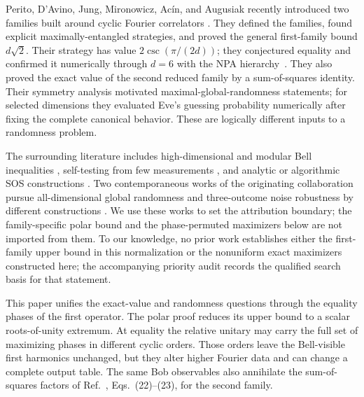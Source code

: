 \documentclass[11pt]{article}
\theoremstyle{definition}
\theoremstyle{remark}
\begin{document}
Perito, D'Avino, Jung, Mironowicz, Ac\'in, and Augusiak recently introduced two
families built around cyclic Fourier correlators
\cite{PeritoEtAl2026}.  They defined the families, found explicit
maximally-entangled strategies, and proved the general first-family bound
\(d\sqrt2\).  Their strategy has value \(2\csc(\pi/(2d))\); they
conjectured equality and confirmed it numerically through \(d=6\) with the
NPA hierarchy~\cite{NPA2007}.  They also proved the exact value of the second
reduced family by a sum-of-squares identity.  Their symmetry analysis motivated
maximal-global-randomness statements; for selected dimensions they evaluated
Eve's guessing probability numerically after fixing the complete canonical
behavior.  These are logically different inputs to a randomness problem.

The surrounding literature includes high-dimensional and modular Bell
inequalities \cite{BuhrmanMassar2005,SalavrakosEtAl2017,KaniewskiEtAl2019},
self-testing from few measurements \cite{SarkarEtAl2021,KlepEtAl2026}, and
analytic or algorithmic SOS constructions
\cite{BarizienEtAl2024,CocciaEtAl2026}.  Two contemporaneous works of the
originating collaboration pursue all-dimensional global randomness and
three-outcome noise robustness by different constructions
\cite{FarkasMironowiczAugusiak2026,DavinoEtAl2026}.  We use these works to
set the attribution boundary; the family-specific polar bound and the
phase-permuted maximizers below are not imported from them.
To our knowledge, no prior work establishes either the first-family upper
bound in this normalization or the nonuniform exact maximizers constructed
here; the accompanying priority audit records the qualified search basis for
that statement.

This paper unifies the exact-value and randomness questions through the
equality phases of the first operator.  The polar proof reduces its upper
bound to a scalar roots-of-unity extremum.  At equality the relative unitary
may carry the full set of maximizing phases in different cyclic orders.
Those orders leave the Bell-visible first harmonics unchanged, but they alter
higher Fourier data and can change a complete output table.  The same Bob
observables also annihilate the sum-of-squares factors of
Ref.~\cite{PeritoEtAl2026}, Eqs.~(22)--(23), for the second family.
\end{document}

